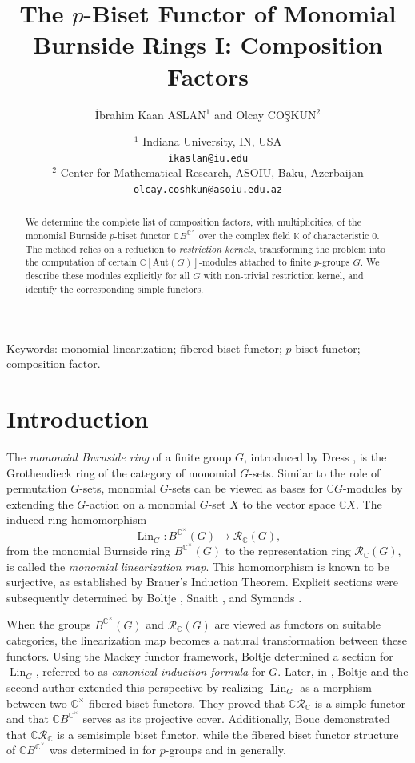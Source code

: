 \documentclass[12pt]{article}
\title{The $p$-Biset Functor of Monomial Burnside Rings I: Composition Factors}
\author{İbrahim Kaan ASLAN$^1$ and Olcay COŞKUN$^2$}
\date{
$^1$ Indiana University, IN, USA \\ \texttt{ikaslan@iu.edu} \\ %
	$^2$ Center for Mathematical Research, ASOIU, Baku, Azerbaijan \\ 
   \texttt{olcay.coshkun@asoiu.edu.az}\\[2ex]%
}
\theoremstyle{plain}
\theoremstyle{definition}
\newcommand{\ling}{\operatorname{Lin}_G}
\begin{document}
\maketitle


    
\begin{abstract}
We determine the complete list of composition factors, with multiplicities, of the monomial Burnside $p$-biset functor $\mathbb C B^{\mathbb{C}^\times}$ over the complex field $\mathbb K$ of characteristic 0. The method relies on a reduction to \emph{restriction kernels}, transforming the problem into the computation of certain $\mathbb C[\mathrm{Aut}(G)]$-modules attached to finite $p$-groups $G$. We describe these modules explicitly for all $G$ with non-trivial restriction kernel, and identify the corresponding simple functors. 
\end{abstract}


Keywords: monomial linearization; fibered biset functor; $p$-biset functor; composition factor.


\section{Introduction}\label{sec:intro}

The \emph{monomial Burnside ring} of a finite group \( G \), introduced by Dress \cite{Dress}, is the Grot\-hen\-dieck ring of the category of monomial \( G \)-sets. Similar to the role of permutation \( G \)-sets, monomial \( G \)-sets can be viewed as bases for \( \mathbb{C}G \)-modules by extending the \( G \)-action on a monomial \( G \)-set \( X \) to the vector space \( \mathbb{C}X \). The induced ring homomorphism 
\[
\ling \colon B^{\mathbb{C}^\times}(G) \to \mathcal{R}_{\mathbb{C}}(G),
\]
from the monomial Burnside ring \( B^{\mathbb{C}^\times}(G) \) to the representation ring \( \mathcal{R}_{\mathbb{C}}(G) \), is called the \emph{monomial linearization map}. This homomorphism is known to be surjective, as established by Brauer's Induction Theorem. Explicit sections were subsequently determined by Boltje \cite{Bo8}, Snaith \cite{Snaith}, and Symonds \cite{Sym}.

When the groups \( B^{\mathbb{C}^\times}(G) \) and \( \mathcal{R}_{\mathbb{C}}(G) \) are viewed as functors on suitable categories, the linearization map becomes a natural transformation between these functors. Using the Mackey functor framework, Boltje \cite{Bo8} determined a section for \( \ling \), referred to as \emph{canonical induction formula} for \( G \). Later, in \cite{BoCo}, Boltje and the second author extended this perspective by realizing \( \ling \) as a morphism between two \( \mathbb{C}^\times \)-fibered biset functors. They proved that \( \mathbb{C}\mathcal{R}_{\mathbb{C}} \) is a simple functor and that \( \mathbb{C}B^{\mathbb{C}^\times} \) serves as its projective cover. Additionally, Bouc \cite{Bouc0} demonstrated that \( \mathbb{C}\mathcal{R}_{\mathbb{C}} \) is a semisimple biset functor, while the fibered biset functor structure of \( \mathbb{C}B^{\mathbb{C}^\times} \) was determined in \cite{CoYi} for $p$-groups and in \cite{BoYi} generally.
\end{document}
